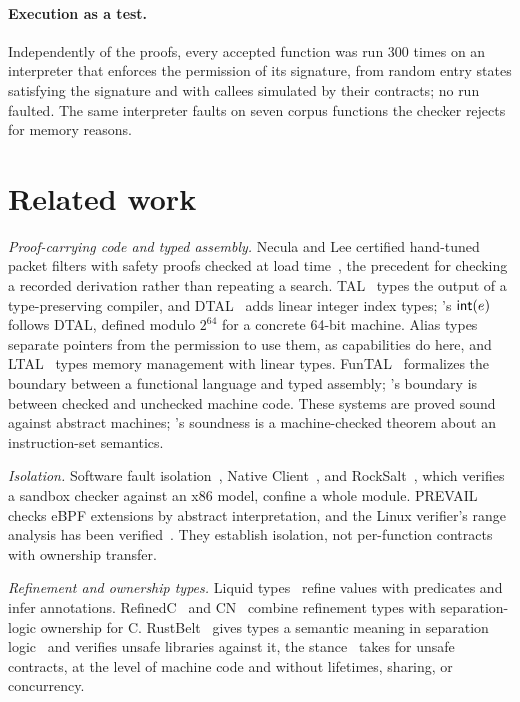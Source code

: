 \paragraph{Execution as a test.} Independently of the proofs, every accepted function was run 300 times on an interpreter that enforces the permission of its signature, from random entry states satisfying the signature and with callees simulated by their contracts; no run faulted. The same interpreter faults on seven corpus functions the checker rejects for memory reasons.

\section{Related work}\label{sec:related}
\emph{Proof-carrying code and typed assembly.} Necula and Lee certified hand-tuned packet filters with safety proofs checked at load time~\cite{pcc96,pcc97}, the precedent for checking a recorded derivation rather than repeating a search. TAL~\cite{tal} types the output of a type-preserving compiler, and DTAL~\cite{dtal} adds linear integer index types; \sys's $\mathsf{int}(e)$ follows DTAL, defined modulo $2^{64}$ for a concrete 64-bit machine. Alias types~\cite{aliastypes} separate pointers from the permission to use them, as capabilities do here, and LTAL~\cite{ltal} types memory management with linear types. FunTAL~\cite{funtal} formalizes the boundary between a functional language and typed assembly; \sys's boundary is between checked and unchecked machine code. These systems are proved sound against abstract machines; \sys's soundness is a machine-checked theorem about an instruction-set semantics.

\emph{Isolation.} Software fault isolation~\cite{sfi}, Native Client~\cite{nacl}, and RockSalt~\cite{rocksalt}, which verifies a sandbox checker against an x86 model, confine a whole module. PREVAIL~\cite{prevail} checks eBPF extensions by abstract interpretation, and the Linux verifier's range analysis has been verified~\cite{ebpfrange}. They establish isolation, not per-function contracts with ownership transfer.

\emph{Refinement and ownership types.} Liquid types~\cite{liquid,llliquid} refine values with predicates and infer annotations. RefinedC~\cite{refinedc} and CN~\cite{cn} combine refinement types with separation-logic ownership for C. RustBelt~\cite{rustbelt} gives types a semantic meaning in separation logic~\cite{seplogic} and verifies unsafe libraries against it, the stance \sys\ takes for unsafe contracts, at the level of machine code and without lifetimes, sharing, or concurrency.

